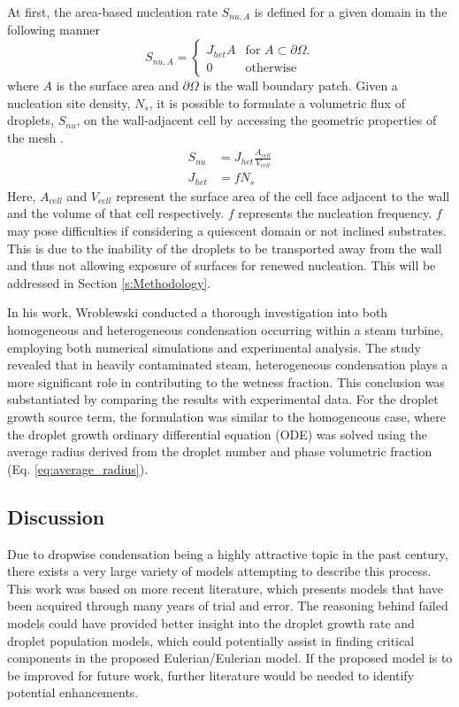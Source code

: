 \documentclass[12pt]{article}
\numberwithin{equation}{section}
\begin{document}
At first, the area-based nucleation rate $S_{nu,A}$ is defined for a given domain in the following manner \cite{janet2015heterogeneous}
\begin{equation}
    S_{nu,A}=\begin{cases}
      J_{het}A & \text{for $A\subset \partial\Omega$}.\\
      0 & \text{otherwise}
    \end{cases}
\end{equation}
where $A$ is the surface area and $\partial\Omega$ is the wall boundary patch. Given a nucleation site density, $N_{s}$, it is possible to formulate a volumetric flux of droplets, $S_{nu}$, on the wall-adjacent cell by accessing the geometric properties of the mesh \cite{janet2015heterogeneous}.
\begin{equation}
    \begin{aligned}
        S_{nu}&=J_{het}\frac{A_{cell}}{V_{cell}}\\
        J_{het}&=fN_{s}
    \end{aligned}
\end{equation} 
Here, $A_{cell}$ and $V_{cell}$ represent the surface area of the cell face adjacent to the wall and the volume of that cell respectively. $f$ represents the nucleation frequency. $f$ may pose difficulties if considering a quiescent domain or not inclined substrates. This is due to the inability of the droplets to be transported away from the wall and thus not allowing exposure of surfaces for renewed nucleation. This will be addressed in Section \ref{s:Methodology}.

In his work, Wroblewski \cite{wroblewski2009numerical} conducted a thorough investigation into both homogeneous and heterogeneous condensation occurring within a steam turbine, employing both numerical simulations and experimental analysis. The study revealed that in heavily contaminated steam, heterogeneous condensation plays a more significant role in contributing to the wetness fraction. This conclusion was substantiated by comparing the results with experimental data. For the droplet growth source term, the formulation was similar to the homogeneous case, where the droplet growth ordinary differential equation (ODE) was solved using the average radius derived from the droplet number and phase volumetric fraction (Eq. \ref{eq:average_radius}).
\subsection{Discussion}\label{ss:Literature-discussion}
Due to dropwise condensation being a highly attractive topic in the past century, there exists a very large variety of models attempting to describe this process. This work was based on more recent literature, which presents models that have been acquired through many years of trial and error. The reasoning behind failed models could have provided better insight into the droplet growth rate and droplet population models, which could potentially assist in finding critical components in the proposed Eulerian/Eulerian model. If the proposed model is to be improved for future work, further literature would be needed to identify potential enhancements.
\end{document}
